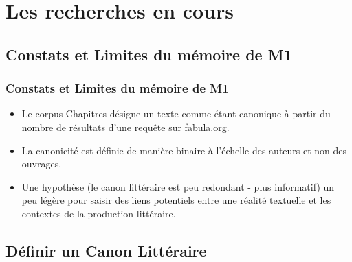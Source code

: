 \documentclass{beamer}
\begin{document}

\section{Les recherches en cours}

\subsection{Constats et Limites du mémoire de M1}

\begin{frame}
\frametitle{Constats et Limites du mémoire de M1}

\begin{itemize}
    \item Le corpus Chapitres désigne un texte comme étant canonique à partir du nombre de résultats d'une requête sur fabula.org.
    \item La canonicité est définie de manière binaire à l'échelle des auteurs et non des ouvrages.
    \item Une hypothèse (le canon littéraire est peu redondant - plus informatif) un peu légère pour saisir des liens potentiels entre une réalité textuelle et les contextes de la production littéraire.
\end{itemize}

\end{frame}

\subsection{Définir un Canon Littéraire}
\end{document}
